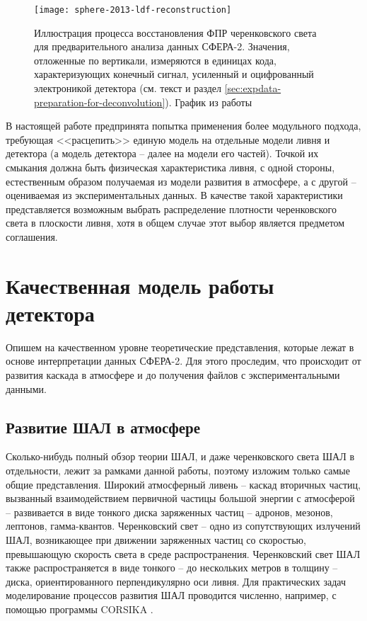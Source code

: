 \begin{figure}
	\centering
	\texttt{[image: sphere-2013-ldf-reconstruction]}
	\caption{Иллюстрация процесса восстановления ФПР черенковского света для предварительного анализа данных СФЕРА-2. Значения, отложенные по вертикали, измеряются в единицах кода, характеризующих конечный сигнал, усиленный и оцифрованный электроникой детектора (см. текст и раздел \ref{sec:expdata-preparation-for-deconvolution}). График из работы \cite[рис. 27]{Sphere2015}}
	\label{pic:sphere-previous-ldf}
\end{figure}

В настоящей работе предпринята попытка применения более модульного подхода, требующая <<расцепить>> единую модель на отдельные модели ливня и детектора (а модель детектора -- далее на модели его частей). Точкой их смыкания должна быть физическая характеристика ливня, с одной стороны, естественным образом получаемая из модели развития в атмосфере, а с другой -- оцениваемая из экспериментальных данных. В качестве такой характеристики представляется возможным выбрать распределение плотности черенковского света в плоскости ливня, хотя в общем случае этот выбор является предметом соглашения.


\section{Качественная модель работы детектора}
\label{sec:sphere-2-model}

Опишем на качественном уровне теоретические представления, которые лежат в основе интерпретации данных СФЕРА-2. Для этого проследим, что происходит от развития каскада в атмосфере и до получения файлов с экспериментальными данными.

\subsection{Развитие ШАЛ в атмосфере}

Сколько-нибудь полный обзор теории ШАЛ, и даже черенковского света ШАЛ в отдельности, лежит за рамками данной работы, поэтому изложим только самые общие представления. Широкий атмосферный ливень -- каскад вторичных частиц, вызванный взаимодействием первичной частицы большой энергии с атмосферой -- развивается в виде тонкого диска заряженных частиц -- адронов, мезонов, лептонов, гамма-квантов. Черенковский свет -- одно из сопутствующих излучений ШАЛ, возникающее при движении заряженных частиц со скоростью, превышающую скорость света в среде распространения. Черенковский свет ШАЛ также распространяется в виде тонкого -- до нескольких метров в толщину -- диска, ориентированного перпендикулярно оси ливня. Для практических задач моделирование процессов развития ШАЛ проводится численно, например, с помощью программы CORSIKA \cite{CORSIKA-report}.


